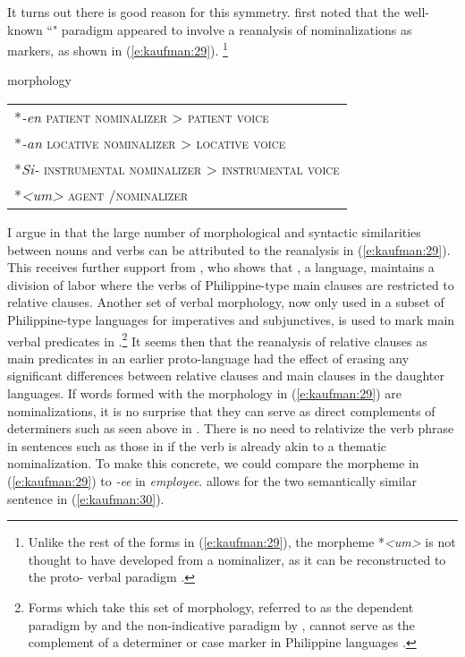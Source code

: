 \documentclass[output=paper]{langsci/langscibook}
\begin{document}
\noindent 
It turns out there is good reason for this symmetry. \citet{Starosta:1982} first noted that the well-known  ``" paradigm appeared to involve a reanalysis of nominalizations as  markers, as shown in (\ref{e:kaufman:29}). \footnote{Unlike the rest of the forms in (\ref{e:kaufman:29}), the  morpheme *\textit{<um>} is not thought to have developed from a nominalizer, as it can be reconstructed to the proto- verbal paradigm \citep{Ross:2002, Ross:2009, Ross:2015a}.}

\clearpage 

\begin{exe}
	\ex\label{e:kaufman:29}{  morphology}\\
	\begin{tabular}{l}
		{*\textit{-en} \textsc{patient nominalizer} > \textsc{patient voice}}\\
		{*\textit{-an} \textsc{locative nominalizer} > \textsc{locative voice}}\\
		{*\textit{Si-} \textsc{instrumental nominalizer} > \textsc{instrumental voice}}\\
		{*\textit{<um>} \textsc{agent \isi{voice}/nominalizer}}
	\end{tabular}
\end{exe}

\noindent
I argue in \citet{Kaufman:2009cons} that the large number of morphological and syntactic similarities between nouns and verbs can be attributed to the reanalysis in (\ref{e:kaufman:29}). This receives further support from \citet{Ross:2009}, who shows that , a  language, maintains a division of labor where the verbs of Philippine-type main clauses are restricted to relative clauses. Another set of verbal morphology, now only used in a subset of Philippine-type languages for imperatives and subjunctives, is used to mark main  verbal predicates in .\footnote{Forms which take this set of morphology, referred to as the dependent paradigm by \citet{Wolff:1973} and the non-indicative paradigm by \citet{Ross:2002}, cannot serve as the complement of a determiner or case marker in Philippine languages \citep[25]{Kaufman:2009cons}.} It seems then that the reanalysis of relative clauses as main  predicates in an earlier  proto-language had the effect of erasing any significant differences between relative clauses and main clauses in the daughter languages. If words formed with  the morphology in (\ref{e:kaufman:29}) are nominalizations, it is no surprise that they can serve as direct complements of determiners such as seen above in . There is no need to relativize the verb phrase in sentences such as those in  if the verb is already akin to a thematic nominalization. To make this concrete, we could compare the  morpheme in (\ref{e:kaufman:29}) to  \textit{-ee} in \textit{employee}.  allows for the two semantically similar sentence in (\ref{e:kaufman:30}). 
\end{document}

